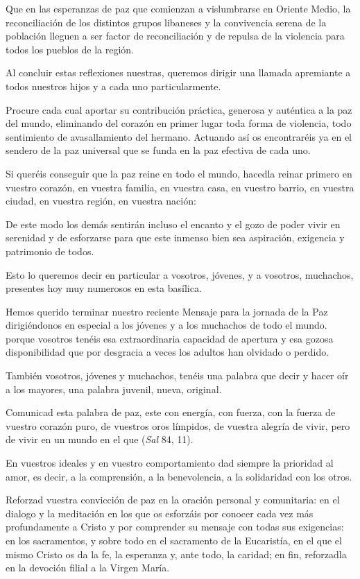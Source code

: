 \begin{body}
	Que en las esperanzas de paz que comienzan a vislumbrarse en Oriente Medio, la reconciliación de los distintos grupos libaneses y la convivencia serena de la población lleguen a ser factor de reconciliación y de repulsa de la violencia para todos los pueblos de la región.
	
	Al concluir estas reflexiones nuestras, queremos dirigir una llamada apremiante a todos nuestros hijos y a cada uno particularmente.
	
	Procure cada cual aportar su contribución práctica, generosa y auténtica a la paz del mundo, eliminando del corazón en primer lugar toda forma de violencia, todo sentimiento de avasallamiento del hermano. Actuando así os encontraréis ya en el sendero de la paz universal que se funda en la paz efectiva de cada uno.
	
	Si queréis conseguir que la paz reine en todo el mundo, hacedla reinar primero en vuestro corazón, en vuestra familia, en vuestra casa, en vuestro barrio, en vuestra ciudad, en vuestra región, en vuestra nación:
	
	De este modo los demás sentirán incluso el encanto y el gozo de poder vivir en serenidad y de esforzarse para que este inmenso bien sea aspiración, exigencia y patrimonio de todos.
	
	Esto lo queremos decir en particular a vosotros, jóvenes, y a vosotros, muchachos, presentes hoy muy numerosos en esta basílica.
	
	Hemos querido terminar nuestro reciente Mensaje para la jornada de la Paz dirigiéndonos en especial a los jóvenes y a los muchachos de todo el mundo. porque vosotros tenéis esa extraordinaria capacidad de apertura y esa gozosa disponibilidad que por desgracia a veces los adultos han olvidado o perdido.
	
	También vosotros, jóvenes y muchachos, tenéis una palabra que decir y hacer oír a los mayores, una palabra juvenil, nueva, original.
	
	Comunicad esta palabra de paz, este  con energía, con fuerza, con la fuerza de vuestro corazón puro, de vuestros oros límpidos, de vuestra alegría de vivir, pero de vivir en un mundo en el que  (\emph{Sal} 84, 11).
	
	En vuestros ideales y en vuestro comportamiento dad siempre la prioridad al amor, es decir, a la comprensión, a la benevolencia, a la solidaridad con los otros.
	
	Reforzad vuestra convicción de paz en la oración personal y comunitaria: en el dialogo y la meditación en los que os esforzáis por conocer cada vez más profundamente a Cristo y por comprender su mensaje con todas sus exigencias: en los sacramentos, y sobre todo en el sacramento de la Eucaristía, en el que el mismo Cristo os da la fe, la esperanza y, ante todo, la caridad; en fin, reforzadla en la devoción filial a la Virgen María.
	

\end{body}
